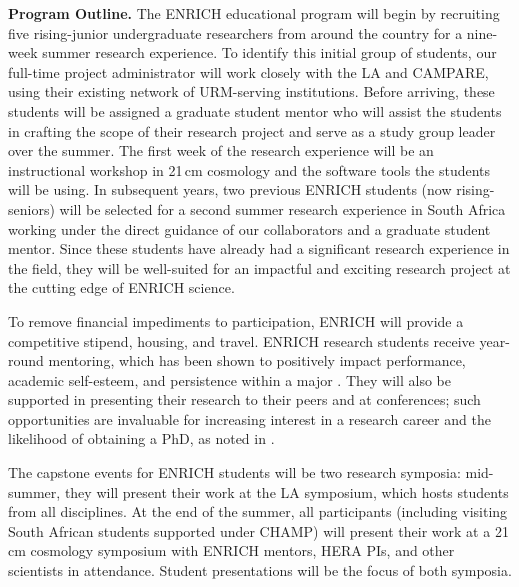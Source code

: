 \documentclass[preprint,11pt]{aastex}
\begin{document}
\textbf{Program Outline.} The ENRICH educational program will begin by recruiting five rising-junior undergraduate researchers from around the country for a nine-week summer research experience.  To identify this initial group of students, our full-time project administrator will work closely with the LA and CAMPARE, using their existing network of URM-serving institutions.  Before arriving, these students will be assigned a graduate student mentor who will assist the students in crafting the scope of their research project and serve as a study group leader over the summer.  The first week of the research experience will be an instructional workshop in 21\,cm cosmology and the software tools the students will be using.  In subsequent years, two previous ENRICH students (now rising-seniors) will be selected for a second summer research experience in South Africa working under the direct guidance of our collaborators and a graduate student mentor.  Since these students have already had a significant research experience in the field, they will be well-suited for an impactful and exciting research project at the cutting edge of ENRICH science.

To remove financial impediments to participation, ENRICH will provide a competitive stipend, housing, and travel.  
ENRICH research students receive year-round mentoring, which has been shown to positively impact performance, academic self-esteem, and persistence within a major \citep{cross_and_vick_2001,armstrong_and_thompson_2003}. They will also be supported in presenting their research to their peers and at conferences; such opportunities are invaluable for increasing interest in a research career and the likelihood of obtaining a PhD, as noted in \cite{nsf_report_2006}.

The capstone events for ENRICH students will be two research symposia: mid-summer, they will present their work at the LA symposium, which hosts students from all disciplines.  At the end of the summer, all participants (including visiting South African students supported under CHAMP) will present their work at a 21\,cm cosmology symposium with ENRICH mentors, HERA PIs, and other scientists in attendance.  Student presentations will be the focus of both symposia.
\end{document}
